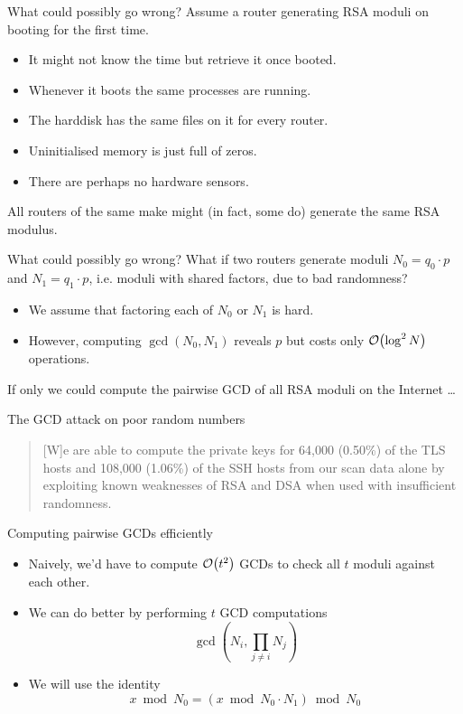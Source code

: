 \documentclass[presentation,smaller]{beamer}
\begin{document}
\begin{frame}[label={sec:org2799b3f}]{What could possibly go wrong?}
Assume a router generating RSA moduli on booting for the first time.

\begin{itemize}
\item It might not know the time but retrieve it once booted.
\item Whenever it boots the same processes are running.
\item The harddisk has the same files on it for every router.
\item Uninitialised memory is just full of zeros.
\item There are perhaps no hardware sensors.
\end{itemize}

All routers of the same make might (in fact, some do) generate the \alert{same} RSA modulus.
\end{frame}

\begin{frame}[label={sec:orgaa09002}]{What could possibly go wrong?}
What if two routers generate moduli \(N_0 = q_0 ⋅ p\) and \(N_1 = q_1 \cdot p\), i.e. moduli with shared factors, due to bad randomness?

\begin{itemize}
\item We assume that factoring each of \(N_0\) or \(N_1\) is hard.
\item However, computing \(\gcd(N_0, N_1)\) reveals \(p\) but costs only \(\bigO{\log^2 N}\) operations.
\end{itemize}

\pause
If only we could compute the pairwise GCD of all RSA moduli on the Internet \dots{}
\end{frame}

\begin{frame}[label={sec:orgab72a6c}]{The GCD attack on poor random numbers}
\begin{quote}
[W]e are able to compute the private keys for 64,000 (0.50\%) of the TLS hosts and 108,000 (1.06\%) of the SSH hosts from our scan data alone by exploiting known weaknesses of RSA and DSA when used with insufficient randomness.
\end{quote}
\end{frame}

\begin{frame}[label={sec:orgb689215}]{Computing pairwise GCDs efficiently}
\begin{itemize}[<+->]
\item Naively, we’d have to compute \(\bigO{t^2}\) GCDs to check all \(t\) moduli against each other.
\item We can do better by performing \(t\) GCD computations \[\gcd(N_i, \prod_{j \neq i} N_j)\]
\item We will use the identity \[x \bmod N_0 = (x \bmod N_0⋅N_1) \bmod N_0\]
\end{itemize}
\end{frame}
\end{document}
